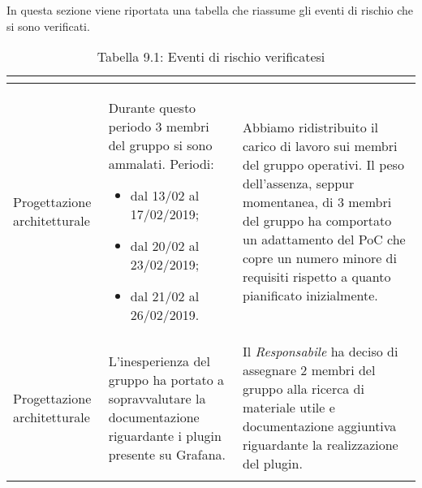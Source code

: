 In questa sezione viene riportata una tabella che riassume gli eventi di rischio che si sono verificati.
\\
\renewcommand{\arraystretch}{1.5}
\begin{longtable}{| m{7em} | m{15em} | m{16em} |}
\hline
\rowcolor{title_row}
\textbf{\color{title_text}{Periodo}}  & \textbf{\color{title_text}{Evento}} & \textbf{\color{title_text}{Reazione}} \\
\endhead
\hline
Progettazione architetturale & Durante questo periodo 3 membri del gruppo si sono ammalati. Periodi:\begin{itemize}
	\item dal 13/02 al 17/02/2019;
	\item dal 20/02 al 23/02/2019;
	\item dal 21/02 al 26/02/2019.
\end{itemize} & Abbiamo ridistribuito il carico di lavoro sui membri del gruppo operativi.
Il peso dell'assenza, seppur momentanea, di 3 membri del gruppo ha comportato un adattamento del PoC che copre un numero minore di requisiti rispetto a quanto pianificato inizialmente. \\
\hline
Progettazione architetturale & L'inesperienza del gruppo ha portato a sopravvalutare la documentazione riguardante i plugin presente su Grafana. & Il \emph{Responsabile} ha deciso di assegnare 2 membri del gruppo alla ricerca di materiale utile e documentazione aggiuntiva riguardante la realizzazione del plugin. \\
\hline
\caption{Tabella 9.1: Eventi di rischio verificatesi\label{}}
\end{longtable}
\renewcommand{\arraystretch}{1}
\newpage

